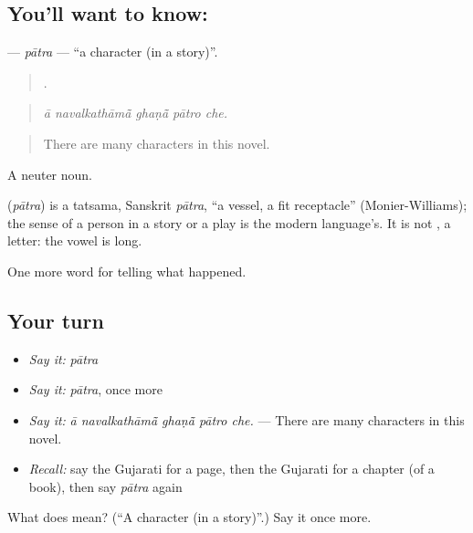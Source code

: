 \subsection*{You'll want to know: }
\textbf{} — \emph{pātra} — \textquotedblleft{}a character (in a story)\textquotedblright{}.

\begin{quote}
    .
\end{quote}

\begin{quote}
\emph{ā navalkathāmā̃ ghaṇā̃ pātro che.}
\end{quote}

\begin{quote}
There are many characters in this novel.
\end{quote}

A neuter noun.

\begin{cousinweb}
\textbf{} (\emph{pātra}) is a tatsama, Sanskrit \emph{pātra}, \textquotedblleft{}a vessel, a fit receptacle\textquotedblright{} (Monier-Williams); the sense of a person in a story or a play is the modern language's. It is not \textbf{}, a letter: the vowel is long.
\end{cousinweb}

\begin{grammarlens}[title={What you've built}]
One more word for telling what happened.
\end{grammarlens}

\subsection*{Your turn}
\begin{itemize}
\raggedright
  \item \emph{Say it:} \emph{pātra}
  \item \emph{Say it:} \emph{pātra}, once more
  \item \emph{Say it:} \emph{ā navalkathāmā̃ ghaṇā̃ pātro che.} — There are many characters in this novel.
  \item \emph{Recall:} say the Gujarati for a page, then the Gujarati for a chapter (of a book), then say \emph{pātra} again
\end{itemize}

\begin{tcolorbox}[breakable,colback=teal!4,colframe=teal!35!black,title={Before you move on}]
What does  mean? (\textquotedblleft{}A character (in a story)\textquotedblright{}.) Say it once more.
\end{tcolorbox}
